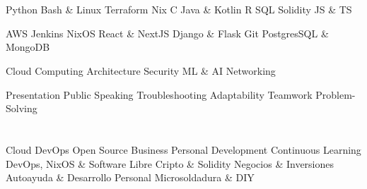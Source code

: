 \documentclass[]{cv}
\begin{document}
\begin{minipage}[t][0pt]{\linewidth}
\begin{minipage}[t]{0.35\textwidth}
\section{}
\locationright{}
Python \textbullet{} Bash \& Linux \textbullet{} Terraform \textbullet{} Nix \textbullet{} C \textbullet{} Java \& Kotlin \textbullet{} R \textbullet{} SQL  \textbullet{} Solidity \textbullet{} JS \& TS
\sectionsep

\locationright{}
AWS \textbullet{} Jenkins \textbullet{} NixOS \textbullet{} React \& NextJS \textbullet{} Django \& Flask  \textbullet{} Git \textbullet{}  PostgresSQL \& MongoDB \\
\sectionsep

\locationright{}
Cloud Computing \textbullet{} Architecture \textbullet{} Security \textbullet{} ML \& AI \textbullet{} Networking \\
\sectionsep

\locationright{}
Presentation \textbullet{} Public Speaking \textbullet{} Troubleshooting \textbullet{} Adaptability \textbullet{} Teamwork \textbullet{} Problem-Solving
\sectionsep



\section{}

\sectionsep

\sectionsep



\section{}
\begin{justify}
\dumblang
{Cloud \textbullet{} DevOps \textbullet{} Open Source \textbullet{} Business \textbullet{} Personal Development \textbullet{} Continuous Learning}
{DevOps, NixOS \& Software Libre \textbullet{} Cripto \& Solidity \textbullet{} Negocios \& Inversiones \textbullet{} Autoayuda \& Desarrollo Personal \textbullet{} Microsoldadura \& DIY}
\end{justify}


\end{minipage}
\end{minipage}
\end{document}
